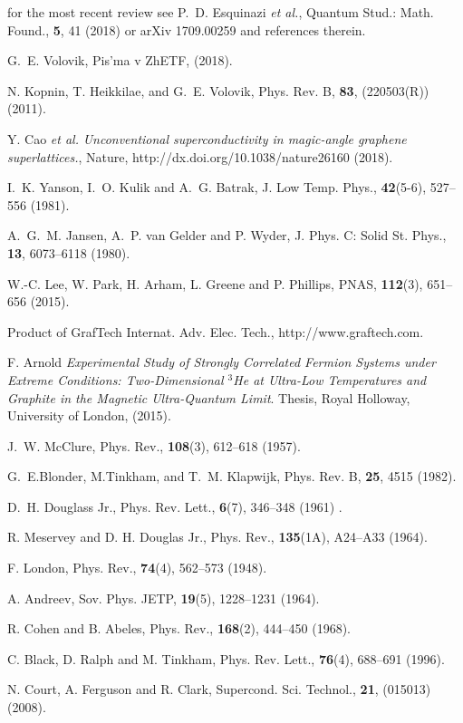 \documentclass[aps,prb,reprint,twocolumn,showpacs]{revtex4-1}
\begin{document}
\begin{thebibliography}{18}

for the most recent review see P.~D. Esquinazi {\it et al.}, Quantum Stud.: Math. Found.,{ \bf 5}, 41 (2018) or arXiv 1709.00259 and references therein.

G.~E. Volovik, Pis'ma v ZhETF,{ \bf } (2018).

N. Kopnin, T. Heikkilae, and G.~E. Volovik, Phys. Rev. B,{ \bf 83}, (220503(R)) (2011).

Y. Cao {\it et al.} {\it Unconventional superconductivity in magic-angle graphene
  superlattices.}, Nature, http://dx.doi.org/10.1038/nature26160 (2018).

I.~K. Yanson, I.~O. Kulik and A.~G. Batrak, J. Low Temp. Phys.,{ \bf 42}(5-6), 527--556 (1981).

A.~G.~M. Jansen, A.~P. van Gelder and P. Wyder, J. Phys. C: Solid St. Phys.,{ \bf 13}, 6073--6118 (1980).

W.-C. Lee, W. Park, H. Arham, L. Greene and P. Phillips, PNAS,{ \bf 112}(3), 651--656 (2015).

Product of GrafTech Internat. Adv. Elec. Tech., http://www.graftech.com.

F. Arnold {\it Experimental Study of Strongly Correlated Fermion Systems under
  Extreme Conditions: Two-Dimensional $^3$He at Ultra-Low Temperatures and
  Graphite in the Magnetic Ultra-Quantum Limit}. Thesis, Royal Holloway, University of London, (2015).

J.~W. McClure, Phys. Rev.,{ \bf 108}(3), 612--618 (1957).

G.~E.Blonder, M.Tinkham, and T.~M. Klapwijk, Phys. Rev. B,{ \bf 25}, 4515 (1982).

D.~H. Douglass Jr., Phys. Rev. Lett.,{ \bf 6}(7), 346--348 (1961) .

R. Meservey and D. H. Douglas Jr., Phys. Rev.,{ \bf 135}(1A), A24--A33 (1964).

F. London, Phys. Rev.,{ \bf 74}(4), 562--573 (1948).

A. Andreev, Sov. Phys. JETP,{ \bf 19}(5), 1228--1231 (1964).

R. Cohen and B. Abeles, Phys. Rev.,{ \bf 168}(2), 444--450 (1968).

C. Black, D. Ralph and M. Tinkham, Phys. Rev. Lett.,{ \bf 76}(4), 688--691 (1996).

N. Court, A. Ferguson and R. Clark, Supercond. Sci. Technol.,{ \bf 21}, (015013) (2008).

\end{thebibliography}
\end{document}
